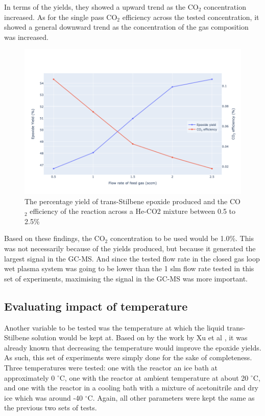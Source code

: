 In terms of the yields, they showed a upward trend as the CO$_2$ concentration increased. As for the single pass CO$_2$ efficiency across the tested concentration, it showed a general downward trend as the concentration of the gas composition was increased. 

\begin{figure}[h!]
	\centering
    \includegraphics[width=\linewidth]{chapter_6/figures/co2_yield_efficiency.png} 
	\caption{The percentage yield of trans-Stilbene epoxide produced and the CO$_2$ efficiency of the reaction across a He-CO2 mixture between 0.5 to 2.5\%}
	\label{fig:co2_yield_efficiency}
\end{figure} 

Based on these findings, the CO$_2$ concentration to be used would be 1.0\%. This was not necessarily because of the yields produced, but because it generated the largest signal in the GC-MS. And since the tested flow rate in the closed gas loop wet plasma system was going to be lower than the 1 slm flow rate tested in this set of experiments, maximising the signal in the GC-MS was more important.

\subsection{Evaluating impact of temperature}

Another variable to be tested was the temperature at which the liquid trans-Stilbene solution would be kept at. Based on by the work by Xu et al \cite{Xu2021}, it was already known that decreasing the temperature would improve the epoxide yields. As such, this set of experiments were simply done for the sake of completeness. Three temperatures were tested: one with the reactor an ice bath at approximately 0 $^{\circ}$C, one with the reactor at ambient temperature at about 20 $^{\circ}$C, and one with the reactor in a cooling bath with a mixture of acetonitrile and dry ice which was around -40 $^{\circ}$C. Again, all other parameters were kept the same as the previous two sets of tests.

